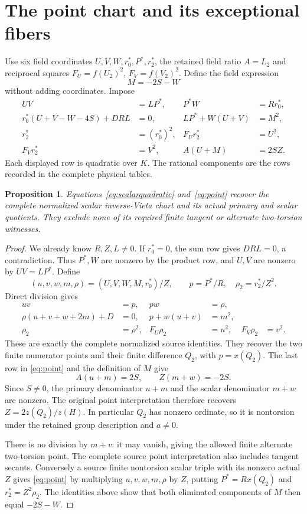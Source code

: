 \documentclass[11pt]{article}
\newtheorem{proposition}[theorem]{Proposition}
\theoremstyle{remark}\newtheorem{remark}[theorem]{Remark}
\begin{document}
\section{The point chart and its exceptional fibers}
Use six field coordinates $U,V,W,r_0^*,P^*,r_2^*$, the retained
field ratio $A=L_2$ and reciprocal squares $F_U=f(U_2)^2$,
$F_V=f(V_2)^2$. Define the field expression
\[
                         M=-2S-W
\]
without adding coordinates. Impose
\begin{equation}\label{eq:point}
\begin{aligned}
 UV&=LP^*,&P^*W&=Rr_0^*,\\
 r_0^*(U+V-W-4S)+DRL&=0,&
 LP^*+W(U+V)&=M^2,\\
 r_2^*&=(r_0^*)^2,&F_Ur_2^*&=U^2,\\
 F_Vr_2^*&=V^2,&A(U+M)&=2SZ.
\end{aligned}
\end{equation}
Each displayed row is quadratic over $K$. The rational components
are the rows recorded in the complete physical tables.

\begin{proposition}\label{prop:point}
Equations~\eqref{eq:scalarquadratic} and~\eqref{eq:point} recover
the complete normalized scalar inverse-Vieta chart and its actual
primary and scalar quotients. They exclude none of its required
finite tangent or alternate two-torsion witnesses.
\end{proposition}
\begin{proof}
We already know $R,Z,L\ne0$. If $r_0^*=0$, the sum row gives
$DRL=0$, a contradiction. Thus $P^*,W$ are nonzero by the
product row, and $U,V$ are nonzero by $UV=LP^*$. Define
\[
 (u,v,w,m,\rho)=(U,V,W,M,r_0^*)/Z,
 \qquad p=P^*/R,\quad \rho_2=r_2^*/Z^2.
\]
Direct division gives
\begin{equation}\label{eq:oldpoint}
\begin{aligned}
 uv&=p,&pw&=\rho,\\
 \rho(u+v+w+2m)+D&=0,&p+w(u+v)&=m^2,\\
 \rho_2&=\rho^2,&F_U\rho_2&=u^2,&F_V\rho_2&=v^2.
\end{aligned}
\end{equation}
These are exactly the complete normalized source identities.
They recover the two finite numerator points and their finite
difference $Q_2$, with $p=x(Q_2)$. The last row in
\eqref{eq:point} and the definition of $M$ give
\[
                     A(u+m)=2S,\qquad Z(m+w)=-2S.
\]
Since $S\ne0$, the primary denominator $u+m$ and the scalar
denominator $m+w$ are nonzero. The original point interpretation
therefore recovers $Z=2z(Q_2)/z(H)$. In particular $Q_2$ has
nonzero ordinate, so it is nontorsion under the retained group
description and $a\ne0$.

There is no division by $m+v$: it may vanish, giving the allowed
finite alternate two-torsion point. The complete source point
interpretation also includes tangent secants. Conversely a source
finite nontorsion scalar triple with its nonzero actual $Z$ gives
\eqref{eq:point} by multiplying $u,v,w,m,\rho$ by $Z$, putting
$P^*=Rx(Q_2)$ and $r_2^*=Z^2\rho_2$. The identities above show
that both eliminated components of $M$ then equal $-2S-W$.
\end{proof}
\end{document}
